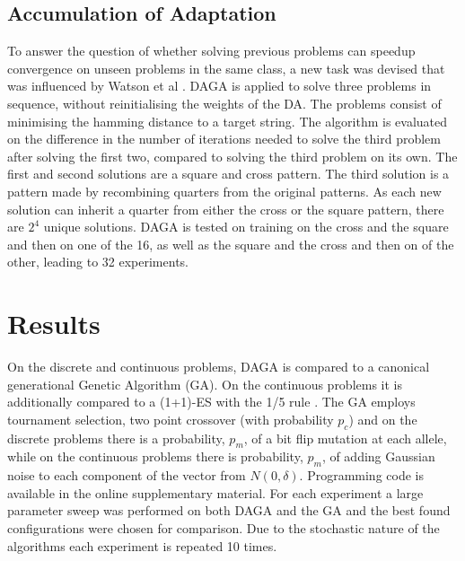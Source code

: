 \documentclass[runningheads,a4paper]{llncs}
\begin{document}
\subsection{Accumulation of Adaptation}
To answer the question of whether solving previous problems can speedup convergence on unseen problems in the same class, a new task was devised that was influenced by Watson et al \cite{watson_evolution}. DAGA is applied to solve three problems in sequence, without reinitialising the weights of the DA. The problems consist of minimising the hamming distance to a target string. The algorithm is evaluated on the difference in the number of iterations needed to solve the third problem after solving the first two, compared to solving the third problem on its own. The first and second solutions are a square and cross pattern. The third solution is a pattern made by recombining quarters from the original patterns. As each new solution can inherit a quarter from either the cross or the square pattern, there are \(2^4\) unique solutions. DAGA is tested on training on the cross and the square and then on one of the 16, as well as the square and the cross and then on of the other, leading to 32 experiments. 

\section{Results}
\label{section:results}
On the discrete and continuous problems, DAGA is compared to a canonical generational Genetic Algorithm (GA). On the continuous problems it is additionally compared to a (1+1)-ES with the 1/5 rule \cite{Igel benchmarking}. The GA employs tournament selection, two point crossover (with probability \(p_c\)) and on the discrete problems there is a probability, \(p_m\), of a bit flip mutation at each allele, while on the continuous problems there is probability, \(p_m\), of adding Gaussian noise to each component of the vector from \(N(0, \delta)\). Programming code is available in the online supplementary material.  For each experiment a large parameter sweep was performed on both DAGA and the GA and the best found configurations were chosen for comparison. Due to the stochastic nature of the algorithms each experiment is repeated 10 times.
\end{document}
